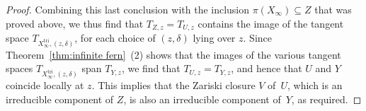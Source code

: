\documentclass[JEP,XML,SOM,Unicode,NoEqCountersInSection]{cedram}
\theoremstyle{definition}
\newcommand\tri{\mathrm{tri}}
\begin{document}
\begin{proof}
Combining this last conclusion with the inclusion
$\pi(X_{\infty}) \subseteq Z$ that was proved above,
we thus find that $T_{Z,z} = T_{U,z}$ contains
the image of the tangent space $T_{X^{\tri}_{\infty},(z,\delta)}$,
for each
choice of $(z,\delta)$ lying over $z$.
Since Theorem~\ref{thm:infinite fern}~(2) shows that
the images of the various tangent spaces $T_{X^{\tri}_{\infty},(z,\delta)}$
span $T_{Y,z}$,
we find that $T_{U,z} = T_{Y,z}$, and hence that $U$ and $Y$ coincide
locally at $z$. This implies that the Zariski closure
$V$ of~$U$, which is an irreducible component of $Z$, is also
an irreducible component of~$Y$, as required.
\end{proof}

\vspace*{-1\baselineskip}\enlargethispage{.5\baselineskip}%
\backmatter


\end{document}
